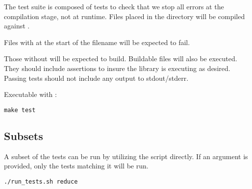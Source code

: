 

The test suite is composed of tests to check that we stop all errors at the compilation stage, not at runtime.
Files placed in the  directory will be compiled against .

Files with  at the start of the filename will be expected to fail.

Those without will be expected to build.
Buildable files will also be executed.
They should include assertions to insure the library is executing as desired.
Passing tests should not include any output to stdout/stderr.


Executable with :

\begin{lstlisting}
make test
\end{lstlisting}




\subsection{Subsets}

A subset of the tests can be run by utilizing the  script directly.
If an argument is provided, only the tests matching it will be run.

\begin{lstlisting}[title=Ex. Run all tests matching reduce]
./run_tests.sh reduce
\end{lstlisting}


